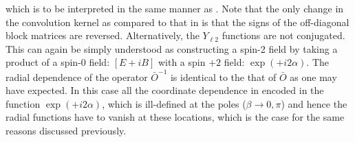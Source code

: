 %
which is to be interpreted in the same manner as . Note that the only change in the convolution kernel as compared to that in  is that the signs of the off-diagonal block matrices are reversed. Alternatively, the $Y_{\ell 2}$ functions are not conjugated. This can again be simply understood as constructing a spin-2 field by taking a product of a spin-0 field: $[E +iB]$ with a spin $+2$ field: $\exp(+i2\alpha)$. The radial dependence of the operator ${\bar O}^{-1}$  is identical to the that of ${\bar O}$ as one may have expected. In this case all the coordinate dependence in encoded in the function $\exp(+i2\alpha)$, which is ill-defined at the poles ($\beta \rightarrow 0,\pi$) and hence the radial functions have to vanish at these locations, which is the case for the same reasons discussed previously.
